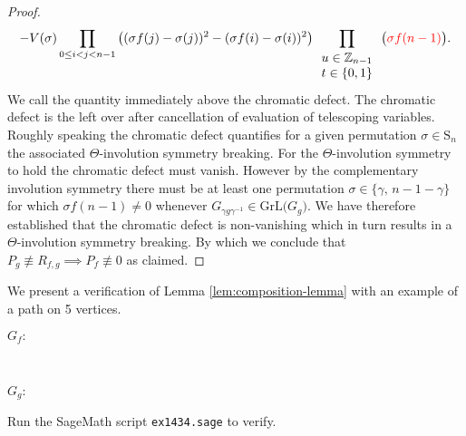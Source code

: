 \begin{proof}
 \[
 -V(\sigma)\prod_{0\le i<j<n-1}\big((\sigma f(j)-\sigma(j))^{2}-(\sigma f(i)-\sigma(i))^{2}\big)\prod_{\begin{array}{c}
u\in\mathbb{Z}_{n-1}\\
t\in\{0,1\}
\end{array}}\big({\color{red}\sigma f(n-1)}\big).
 \]
 We call the quantity immediately above the chromatic defect. The chromatic defect is the left over after cancellation of evaluation of telescoping variables. Roughly speaking the chromatic defect quantifies for a given permutation $\sigma\in\text{S}_{n}$ the associated $\Theta$-involution symmetry breaking. For the $\Theta$-involution symmetry to hold the chromatic defect must vanish. However by the complementary involution symmetry there must be at least one permutation $\sigma\in\{\gamma,\,n-1-\gamma\}$ for which $\sigma f(n-1)\ne0$ whenever $G_{\gamma g\gamma^{-1}}\in\text{GrL}\big(G_{g}\big)$. We have therefore established that the chromatic defect is non-vanishing which in turn results in a $\Theta$-involution symmetry breaking. By which we conclude that $P_{g}\not\equiv R_{f,g}\implies P_{f}\not\equiv0$ as claimed.
\end{proof}

\begin{example} We present a verification of Lemma \ref{lem:composition-lemma} with an example of a path on 5 vertices.
\ \\
\begin{center}   $G_f: \;$
\end{center}
\ \\
\begin{center}   
$G_g: \;$
\end{center}
Run the SageMath script \texttt{ex1434.sage} to verify.
\end{example}
